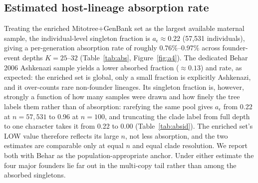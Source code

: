\documentclass[11pt]{article}
\begin{document}
\subsection{Estimated host-lineage absorption rate}
Treating the enriched Mitotree+GenBank set as the largest available maternal sample, the individual-level singleton fraction is $a_\epsilon \approx 0.22$ (57,531 individuals), giving a per-generation absorption rate of roughly 0.76\%--0.97\% across founder-event depths $K = 25$--$32$ (Table~\ref{tab:abs}, Figure~\ref{fig:a4}). The dedicated Behar 2006 Ashkenazi sample yields a lower absorbed fraction ($\approx 0.13$) and rate, as expected: the enriched set is global, only a small fraction is explicitly Ashkenazi, and it over-counts rare non-founder lineages. Its singleton fraction is, however, strongly a function of how many samples were drawn and how finely the tree labels them rather than of absorption: rarefying the same pool gives $a_\epsilon$ from 0.22 at $n = 57{,}531$ to 0.96 at $n = 100$, and truncating the clade label from full depth to one character takes it from 0.22 to 0.00 (Table~\ref{tab:absid}). The enriched set's LOW value therefore reflects its large $n$, not less absorption, and the two estimates are comparable only at equal $n$ and equal clade resolution. We report both with Behar as the population-appropriate anchor. Under either estimate the four major founders lie far out in the multi-copy tail rather than among the absorbed singletons.
\end{document}
